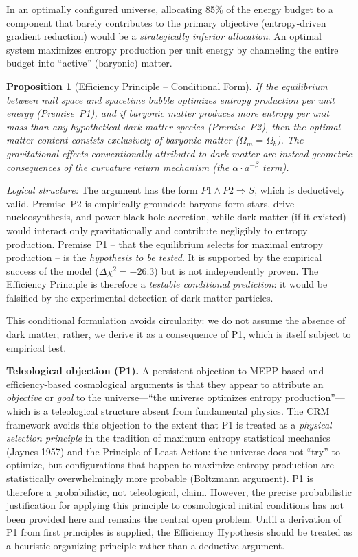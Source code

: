 \documentclass[aps,prd,twocolumn,superscriptaddress,nofootinbib]{revtex4-2}
\newtheorem{proposition}{Proposition}
\begin{document}
In an optimally configured universe, allocating 85\% of the energy budget to a component that barely contributes to the primary objective (entropy-driven gradient reduction) would be a \textit{strategically inferior allocation}. An optimal system maximizes entropy production per unit energy by channeling the entire budget into ``active'' (baryonic) matter.

\begin{proposition}[Efficiency Principle -- Conditional Form]
\textit{If} the equilibrium between null space and spacetime bubble optimizes entropy production per unit energy (Premise~P1), and \textit{if} baryonic matter produces more entropy per unit mass than any hypothetical dark matter species (Premise~P2), \textit{then} the optimal matter content consists exclusively of baryonic matter ($\Omega_m = \Omega_b$). The gravitational effects conventionally attributed to dark matter are instead geometric consequences of the curvature return mechanism (the $\alpha \cdot a^{-\beta}$ term).
\end{proposition}

\textit{Logical structure:} The argument has the form $P1 \wedge P2 \Rightarrow S$, which is deductively valid. Premise~P2 is empirically grounded: baryons form stars, drive nucleosynthesis, and power black hole accretion, while dark matter (if it existed) would interact only gravitationally and contribute negligibly to entropy production. Premise~P1 -- that the equilibrium selects for maximal entropy production -- is the \textit{hypothesis to be tested}. It is supported by the empirical success of the model ($\Delta\chi^2 = -26.3$) but is not independently proven. The Efficiency Principle is therefore a \textit{testable conditional prediction}: it would be falsified by the experimental detection of dark matter particles.

This conditional formulation avoids circularity: we do not assume the absence of dark matter; rather, we derive it as a consequence of P1, which is itself subject to empirical test.

\textbf{Teleological objection (P1).} A persistent objection to MEPP-based and efficiency-based cosmological arguments is that they appear to attribute an \textit{objective} or \textit{goal} to the universe---``the universe optimizes entropy production''---which is a teleological structure absent from fundamental physics. The CRM framework avoids this objection to the extent that P1 is treated as a \textit{physical selection principle} in the tradition of maximum entropy statistical mechanics (Jaynes 1957) and the Principle of Least Action: the universe does not ``try'' to optimize, but configurations that happen to maximize entropy production are statistically overwhelmingly more probable (Boltzmann argument). P1 is therefore a probabilistic, not teleological, claim. However, the precise probabilistic justification for applying this principle to cosmological initial conditions has not been provided here and remains the central open problem. Until a derivation of P1 from first principles is supplied, the Efficiency Hypothesis should be treated as a heuristic organizing principle rather than a deductive argument.
\end{document}
